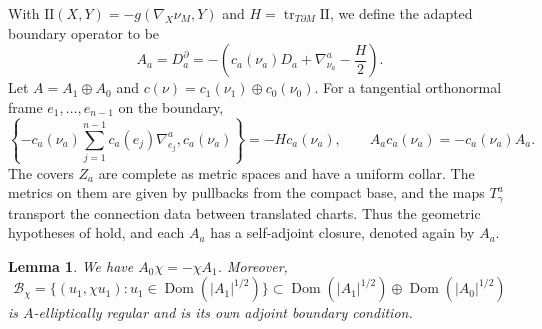 \documentclass[12pt,reqno]{amsart}
\numberwithin{equation}{section}
\newtheorem{lemma}[theorem]{Lemma}
\theoremstyle{definition}
\begin{document}
With $\mathrm{II}(X,Y)=-g(\nabla_X\nu_M,Y)$ and
$H=\operatorname{tr}_{T\partial M}\mathrm{II}$, we define the adapted boundary operator to be
\[
 A_a=D_a^\partial
 =-\left(c_a(\nu_a)D_a+\nabla^a_{\nu_a}-\frac H2\right).
\]
Let $A=A_1\oplus A_0$ and
$c(\nu)=c_1(\nu_1)\oplus c_0(\nu_0)$.
For a tangential orthonormal frame $e_1,\ldots,e_{n-1}$ on the boundary,
\[
 \left\{-c_a(\nu_a)\sum_{j=1}^{n-1}c_a(e_j)\nabla^a_{e_j},
 c_a(\nu_a)\right\}=-Hc_a(\nu_a),
 \qquad A_ac_a(\nu_a)=-c_a(\nu_a)A_a.
\]
The covers $Z_a$ are complete as metric spaces and have a uniform collar.
The metrics on them are given by pullbacks from the compact base, and the maps $T^a_\gamma$
transport the connection data between translated charts.  Thus the
geometric hypotheses of \cite[Proposition~9.2]{BaerBandara} hold,
and each $A_a$ has a self-adjoint closure, denoted again by $A_a$.

\begin{lemma}\label{lem:matching-boundary}
We have $A_0\chi=-\chi A_1$.  Moreover,
\[
 \mathcal B_\chi
 =\{(u_1,\chi u_1):u_1\in\operatorname{Dom}(|A_1|^{1/2})\}
 \subset\operatorname{Dom}(|A_1|^{1/2})\oplus
 \operatorname{Dom}(|A_0|^{1/2})
\]
is $A$-elliptically regular and is its own adjoint boundary condition.
\end{lemma}
\end{document}
